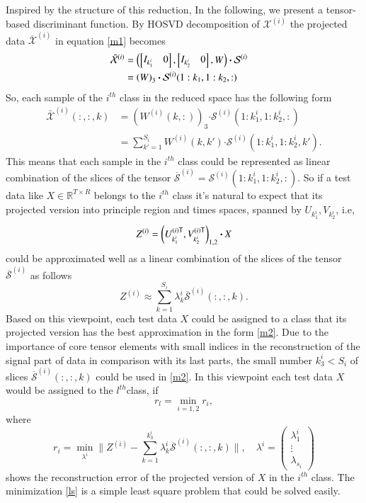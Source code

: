 \documentclass[preprint,12pt]{elsarticle}
\begin{document}
	Inspired by the structure of this reduction,  In the following, we present a tensor-based discriminant function.
	By HOSVD decomposition of
	$\mathcal{X}^{(i)}$ the projected data $\overline{\mathcal{X}}^{(i)}$ in equation \eqref{m1} becomes
	\begin{align}
	\bar{\mathcal{X}}^{(i)}&=  \notag
	\left(
	\begin{bmatrix}
	I_{k_1^i} &  0
	\end{bmatrix},
	\begin{bmatrix}
	I_{k_2^i} &  0
	\end{bmatrix},
	W
	\right)\boldsymbol{\cdot} \mathcal{S}^{(i)} \notag
	\\&=\left( 
	W
	\right)_{3} \boldsymbol{\cdot} \mathcal{S}^{(i)}(1:k_1, 1:k_2, :) \notag &
	\end{align}
	So,  each sample of the $i^{th}$ class in the reduced space has the following form
	\begin{align*}
	\bar{{\mathcal{X}}}^{(i)}(:,:,k) &= \left(  
	W^{(i)}(k,:)
	\right)_{3} \boldsymbol{\cdot} \mathcal{S}^{(i)}(1:k_1^i, 1:k_2^i, :)\\
	&= \sum_{k' = 1}^{S_i} W^{(i)}(k,k') \boldsymbol{\cdot} \mathcal{S}^{(i)}(1:k_1^i, 1:k_2^i, k').
	\end{align*}
	This means that each sample in the $i^{th}$ class could be represented as linear combination of the slices  of the tensor $\overline{\mathcal{S}}^{(i)}=\mathcal{S}^{(i)}(1:k_1^i, 1:k_2^i, :)$.
	So if a test data like $X\in \mathbb{R}^{T\times R}$ belongs to the $i^{th}$ class
	it's natural to expect that its
	projected version into principle region and times spaces, spanned by $U_{k_1^i},V_{k_2^i}$, i.e,
	\[
	Z^{(i)}= \left( U_{k_1^i}^{(i)\sf T}, V_{k_2^i}^{(i)\sf T} 
	\right)_{1,2}\boldsymbol{\cdot} X
	\]
	could be approximated well as a linear combination of the slices of the tensor $\overline{\mathcal{S}}^{(i)}$ as follows
	\begin{equation}
	\label{m2}
	Z^{(i)} \approx \sum_{k=1}^{S_i} \lambda_k^i \overline{\mathcal{S}}^{(i)}(:,:,k).
	\end{equation}
	Based on this viewpoint, each test data $X$ could be assigned to a class that its projected version has the best approximation in the form \eqref{m2}. 
	Due to the importance of core tensor elements with small indices in the reconstruction of the signal part of data in comparison with its last parts,
	the small number $k_3^i< S_i$  of slices $\overline{\mathcal{S}}^{(i)}(:,:,k)$ could be used in \eqref{m2}. 
	In this viewpoint each test data
	$X$ would be assigned to the $l^{th}$class, if
	\[
	r_{l}=\min_{i=1,2} {r_{i}},
	\]
	where
	\begin{equation}
	\label{ls}
	r_{i}=\min_{{\lambda^{i}}} \|Z^{(i)} -\sum_{k=1}^{k_3^i} \lambda_k^i \overline{\mathcal{S}}^{(i)}(:,:,k)\|,\quad
	\lambda^i=\begin{pmatrix}
	\lambda_1^i\\
	\vdots\\
	\lambda_{s_i}
	\end{pmatrix}
	\end{equation}
	shows the reconstruction error of the projected version of $X$ in the $i^{th}$ class.
	The minimization  \eqref{ls} is a simple least square problem that could be solved easily.
	
\end{document}
